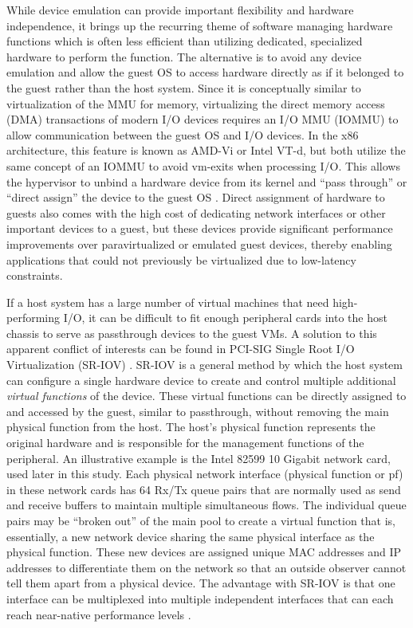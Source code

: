 While device emulation can provide important flexibility and hardware independence, it brings up the recurring theme of software managing hardware functions which is often less efficient than utilizing dedicated, specialized hardware to perform the function.
The alternative is to avoid any device emulation and allow the guest OS to access hardware directly as if it belonged to the guest rather than the host system.
Since it is conceptually similar to virtualization of the MMU for memory, virtualizing the direct memory access (DMA) transactions of modern I/O devices requires an I/O MMU (IOMMU) to allow communication between the guest OS and I/O devices.
In the x86 architecture, this feature is known as AMD-Vi or Intel VT-d, but both utilize the same concept of an IOMMU to avoid vm-exits when processing I/O.
This allows the hypervisor to unbind a hardware device from its kernel and ``pass through'' or ``direct assign'' the device to the guest OS \autocite{_jones_1}.
Direct assignment of hardware to guests also comes with the high cost of dedicating network interfaces or other important devices to a guest, but these devices provide significant performance improvements over paravirtualized or emulated guest devices, thereby enabling applications that could not previously be virtualized due to low-latency constraints.

If a host system has a large number of virtual machines that need high-performing I/O, it can be difficult to fit enough peripheral cards into the host chassis to serve as passthrough devices to the guest VMs.
A solution to this apparent conflict of interests can be found in PCI-SIG Single Root I/O Virtualization (SR-IOV) \autocite{_pcisig_1, intelvtd}.
SR-IOV is a general method by which the host system can configure a single hardware device to create and control multiple additional \emph{virtual functions} of the device.
These virtual functions can be directly assigned to and accessed by the guest, similar to passthrough, without removing the main physical function from the host.
The host's physical function represents the original hardware and is responsible for the management functions of the peripheral.  
An illustrative example is the Intel 82599 10 Gigabit network card, used later in this study.
Each physical network interface (physical function or pf) in these network cards has 64 Rx/Tx queue pairs that are normally used as send and receive buffers to maintain multiple simultaneous flows.
The individual queue pairs may be ``broken out'' of the main pool to create a virtual function that is, essentially, a new network device sharing the same physical interface as the physical function.
These new devices are assigned unique MAC addresses and IP addresses to differentiate them on the network so that an outside observer cannot tell them apart from a physical device.
The advantage with SR-IOV is that one interface can be multiplexed into multiple independent interfaces that can each reach near-native performance levels \autocite{_nasa_1}.

